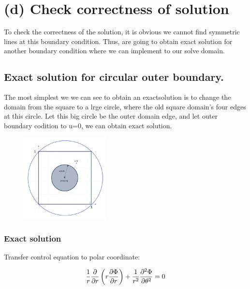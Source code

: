 \documentclass[12pt]{article}
\begin{document}
\section{(d) Check correctness of solution}

To check the correctness of the solution, it is obvious we cannot find symmetric lines
at this boundary condition. Thus, are going to obtain exact solution for another 
boundary condition where we can implement to our solve domain.


\subsection{Exact solution for circular outer boundary.}

The most simplest we we can see to obtain an exactsolution is to change the domain
from the square to a lrge circle, where the old square domain's four edges at this 
circle. Let this big circle be the outer domain edge, and let outer boundary
codition to u=0, we can obtain exact solution.\\



\begin{figure}[H]
    \centering
    \includegraphics[width=0.4\textwidth]{ExactDomain.jpg}
    \label{ExactDomain.jpg}
\end{figure}





\subsubsection{Exact solution}


Transfer control equation to polar coordinate:

\begin{equation}
    \frac{1}{r} \frac{\partial}{\partial r} \left( r \frac{\partial \Phi}{\partial r} \right) + \frac{1}{r^2} \frac{\partial^2 \Phi}{\partial \theta^2} = 0 \\
\end{equation}
\end{document}
